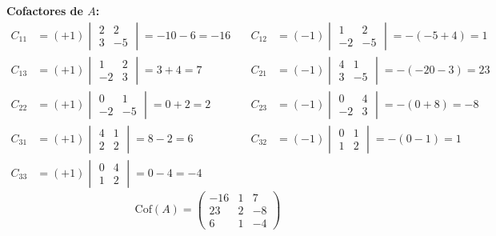 \documentclass[12pt]{article}
\begin{document}
\begin{enumerate}[label=\alph*.-]
    \textbf{Cofactores de $A$:}
    \[
    \begin{aligned}
    C_{11} &= (+1)\begin{vmatrix}2&2\\3&-5\end{vmatrix} = -10-6 = -16 &\quad
    C_{12} &= (-1)\begin{vmatrix}1&2\\-2&-5\end{vmatrix} = -(-5+4) = 1\\[4pt]
    C_{13} &= (+1)\begin{vmatrix}1&2\\-2&3\end{vmatrix} = 3+4 = 7 &\quad
    C_{21} &= (-1)\begin{vmatrix}4&1\\3&-5\end{vmatrix} = -(-20-3) = 23\\[4pt]
    C_{22} &= (+1)\begin{vmatrix}0&1\\-2&-5\end{vmatrix} = 0+2 = 2 &\quad
    C_{23} &= (-1)\begin{vmatrix}0&4\\-2&3\end{vmatrix} = -(0+8) = -8\\[4pt]
    C_{31} &= (+1)\begin{vmatrix}4&1\\2&2\end{vmatrix} = 8-2 = 6 &\quad
    C_{32} &= (-1)\begin{vmatrix}0&1\\1&2\end{vmatrix} = -(0-1) = 1\\[4pt]
    C_{33} &= (+1)\begin{vmatrix}0&4\\1&2\end{vmatrix} = 0-4 = -4 &
    \end{aligned}
    \]
    \[
    \text{Cof}(A) = \begin{pmatrix}-16&1&7\\23&2&-8\\6&1&-4\end{pmatrix}
    \]


\end{enumerate}
\end{document}
